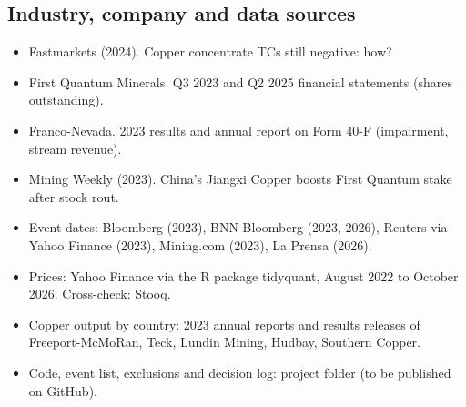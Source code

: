 \documentclass[11pt]{article}
\begin{document}
\subsection*{Industry, company and data sources}
\small
\begin{itemize}[leftmargin=1.2em, itemsep=0.1em]
\item Fastmarkets (2024). Copper concentrate TCs still negative: how?
\item First Quantum Minerals. Q3 2023 and Q2 2025 financial statements (shares outstanding).
\item Franco-Nevada. 2023 results and annual report on Form 40-F (impairment, stream revenue).
\item Mining Weekly (2023). China's Jiangxi Copper boosts First Quantum stake after stock rout.
\item Event dates: Bloomberg (2023), BNN Bloomberg (2023, 2026), Reuters via Yahoo Finance (2023), Mining.com (2023), La Prensa (2026).
\item Prices: Yahoo Finance via the R package tidyquant, August 2022 to October 2026. Cross-check: Stooq.
\item Copper output by country: 2023 annual reports and results releases of Freeport-McMoRan, Teck, Lundin Mining, Hudbay, Southern Copper.
\item Code, event list, exclusions and decision log: project folder (to be published on GitHub).
\end{itemize}
\end{document}
